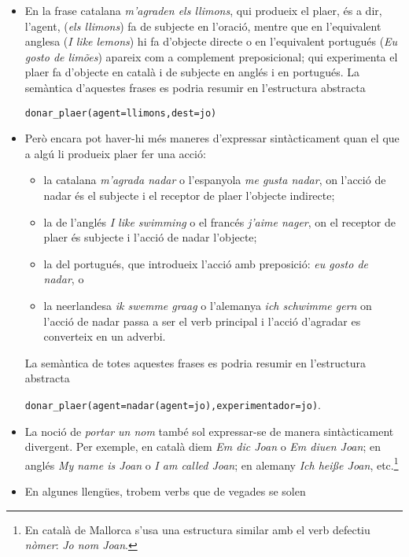 \begin{itemize}
\item En la frase catalana \emph{m'agraden els llimons}, qui produeix
  el plaer, és a dir, l'agent, (\emph{els llimons}) fa de subjecte en
  l'oració, mentre que en l'equivalent anglesa (\emph{I like lemons})
  hi fa d'objecte directe o en l'equivalent portugués (\emph{Eu gosto
    de limões}) apareix com a complement preposicional; qui
  experimenta el plaer fa d'objecte en català i de subjecte en anglés
  i en portugués. La semàntica d'aquestes frases es podria resumir en
  l'estructura abstracta
  \begin{center}
    \texttt{donar\_plaer(agent=llimons,dest=jo)}
  \end{center}
\item \label{pg:magradanadar} Però encara pot haver-hi més maneres d'expressar
  sintàcticament quan el que a algú li produeix plaer fer una acció:
  \begin{itemize}
  \item la catalana \emph{m'agrada nadar} o l'espanyola \emph{me gusta
      nadar}, on l'acció de nadar és el subjecte i el receptor de
    plaer l'objecte indirecte;
  \item la de l'anglés \emph{I like swimming} o el francés
    \emph{j'aime nager}, on el receptor de plaer és subjecte i l'acció
    de nadar l'objecte;
  \item la del portugués, que introdueix l'acció amb preposició:
    \emph{eu gosto de nadar}, o
  \item la neerlandesa \emph{ik swemme graag} o l'alemanya \emph{ich
      schwimme gern} on l'acció de nadar passa a ser el verb principal
    i l'acció d'agradar es converteix en un adverbi.
  \end{itemize}
La semàntica de totes aquestes frases es podria resumir en l'estructura abstracta 
\begin{center}
  \texttt{donar\_plaer(agent=nadar(agent=jo),experimentador=jo)}.
\end{center}
\item La noció de \emph{portar un nom} també sol expressar-se de
  manera sintàcticament divergent. Per exemple, en català diem
  \emph{Em dic Joan} o \emph{Em diuen Joan}; en anglés \emph{My name
    is Joan} o \emph{I am called Joan}; en alemany \emph{Ich hei{\ss}e
    Joan}, etc.\footnote{En català de Mallorca s'usa una estructura
    similar amb el verb defectiu \emph{nòmer}: \emph{Jo nom Joan}.}
\item En algunes llengües, trobem verbs que de vegades se solen

\end{itemize}
